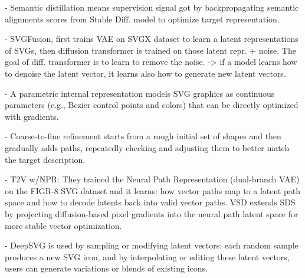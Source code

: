 - Semantic distillation means supervision signal got by backpropagating semantic alignments scores from Stable Diff. model to optimize target representation. 

- SVGFusion, first trains VAE on SVGX dataset to learn a latent representations of SVGs, then diffusion transformer is trained on those latent repr. + noise. The goal of diff. transformer is to learn to remove the noise. -> if a model learns how to denoise the latent vector, it learns also how to generate new latent vectors.     

- A parametric internal representation models SVG graphics as continuous parameters (e.g., Bezier control points and colors) that can be directly optimized with gradients.

- Coarse-to-fine refinement starts from a rough initial set of shapes and then gradually adds paths, repeatedly checking and adjusting them to better match the target description.

- T2V w/NPR: They trained the Neural Path Representation (dual-branch VAE) on the FIGR-8 SVG dataset and it learns: how vector paths map to a latent path space and how to decode latents back into valid vector paths. VSD extends SDS by projecting diffusion-based pixel gradients into the neural path latent space for more stable vector optimization.

- DeepSVG is used by sampling or modifying latent vectors: each random sample produces a new SVG icon, and by interpolating or editing these latent vectors, users can generate variations or blends of existing icons.









